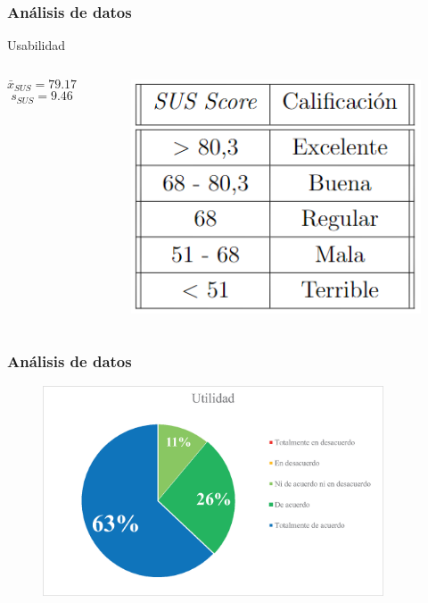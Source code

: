 \documentclass[9pt]{beamer}
\begin{document}
    \begin{frame}      
        \frametitle{Análisis de datos}
        Usabilidad
       \begin{columns}
            $$ \bar{x}_{SUS} = 79.17$$
            $$ s_{SUS} = 9.46$$
    
            \begin{figure}
                \centering
                \includegraphics[width=\textwidth]{assets/Evaluacion/SUS_Score.png}
            \end{figure}
       \end{columns}
    \end{frame}

    \begin{frame}      
        \frametitle{Análisis de datos}
        \begin{figure}
            \centering
            \includegraphics[width=0.9\textwidth]{assets/Evaluacion/utility.eps}
        \end{figure}
    \end{frame}
\end{document}
